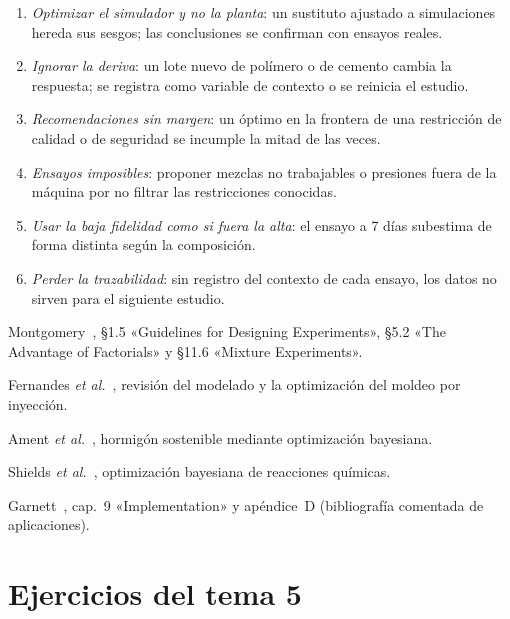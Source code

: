 \begin{observacion}\label{obs:errores5}
\begin{enumerate}
  \item \emph{Optimizar el simulador y no la planta}: un sustituto ajustado a simulaciones hereda sus sesgos; las conclusiones se confirman con ensayos reales.
  \item \emph{Ignorar la deriva}: un lote nuevo de polímero o de cemento cambia la respuesta; se registra como variable de contexto o se reinicia el estudio.
  \item \emph{Recomendaciones sin margen}: un óptimo en la frontera de una restricción de calidad o de seguridad se incumple la mitad de las veces.
  \item \emph{Ensayos imposibles}: proponer mezclas no trabajables o presiones fuera de la máquina por no filtrar las restricciones conocidas.
  \item \emph{Usar la baja fidelidad como si fuera la alta}: el ensayo a 7 días subestima de forma distinta según la composición.
  \item \emph{Perder la trazabilidad}: sin registro del contexto de cada ensayo, los datos no sirven para el siguiente estudio.
\end{enumerate}
\end{observacion}

\begin{lecturas}
\item Montgomery~\cite{montgomery}, §1.5 «Guidelines for Designing Experiments», §5.2 «The Advantage of Factorials» y §11.6 «Mixture Experiments».
\item Fernandes \emph{et al.}~\cite{fernandes}, revisión del modelado y la optimización del moldeo por inyección.
\item Ament \emph{et al.}~\cite{ament}, hormigón sostenible mediante optimización bayesiana.
\item Shields \emph{et al.}~\cite{shields}, optimización bayesiana de reacciones químicas.
\item Garnett~\cite{garnett}, cap.~9 «Implementation» y apéndice~D (bibliografía comentada de aplicaciones).
\end{lecturas}

\section*{Ejercicios del tema 5}

